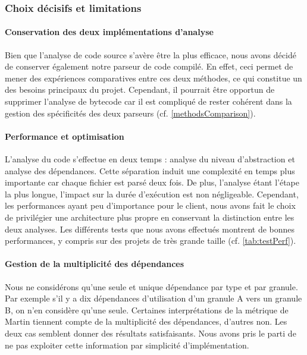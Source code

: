 \documentclass{scrartcl}
\begin{document}
    \subsubsection{Choix décisifs et limitations}
    \label{limit}
    
        \paragraph{Conservation des deux implémentations d'analyse}Bien que l'analyse de code source s'avère être la plus efficace, nous avons décidé de conserver également notre parseur de code compilé. En effet, ceci permet de mener des expériences comparatives entre ces deux méthodes, ce qui constitue un des besoins principaux du projet. Cependant, il pourrait être opportun de supprimer l'analyse de bytecode car il est compliqué de rester cohérent dans la gestion des spécificités des deux parseurs (cf. \ref{methodsComparison}).
        
        \paragraph{Performance et optimisation}L'analyse du code s'effectue en deux temps : analyse du niveau d'abstraction et analyse des dépendances. Cette séparation induit une complexité en temps plus importante car chaque fichier est parsé deux fois. De plus, l'analyse étant l'étape la plus longue, l'impact sur la durée d'exécution est non négligeable. Cependant, les performances ayant peu d'importance pour le client, nous avons fait le choix de privilégier une architecture plus propre en conservant la distinction entre les deux analyses. Les différents tests que nous avons effectués montrent de bonnes performances, y compris sur des projets de très grande taille (cf. \ref{tab:testPerf}).
        
        \paragraph{Gestion de la multiplicité des dépendances}Nous ne considérons qu'une seule et unique dépendance par type et par granule. Par exemple s'il y a dix dépendances d'utilisation d'un granule A vers un granule B, on n'en considère qu'une seule. Certaines interprétations de la métrique de Martin tiennent compte de la multiplicité des dépendances\cite{Martin:2003}, d'autres non\cite{Spinellis:2006}. Les deux cas semblent donner des résultats satisfaisants. Nous avons pris le parti de ne pas exploiter cette information par simplicité d'implémentation.
        
\end{document}
